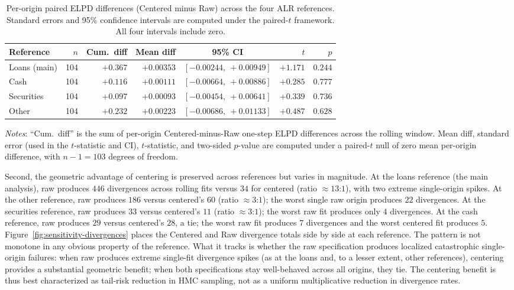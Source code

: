 \documentclass[12pt]{article}
\theoremstyle{remark}
\begin{document}
\begin{table}[!t]
\centering
\caption{Per-origin paired ELPD differences (Centered minus Raw) across the four ALR references. Standard errors and 95\% confidence intervals are computed under the paired-$t$ framework. All four intervals include zero.}
\label{tab:paired-elpd-ci}
\begin{tabular}{lrrrcrr}
\toprule
Reference & $n$ & Cum.\ diff & Mean diff & 95\% CI & $t$ & $p$ \\
\midrule
Loans (main) & 104 & $+0.367$ & $+0.00353$ & $[-0.00244,\ +0.00949]$ & $+1.171$ & $0.244$ \\
Cash         & 104 & $+0.116$ & $+0.00111$ & $[-0.00664,\ +0.00886]$ & $+0.285$ & $0.777$ \\
Securities   & 104 & $+0.097$ & $+0.00093$ & $[-0.00454,\ +0.00641]$ & $+0.339$ & $0.736$ \\
Other        & 104 & $+0.232$ & $+0.00223$ & $[-0.00686,\ +0.01133]$ & $+0.487$ & $0.628$ \\
\bottomrule
\end{tabular}

\vspace{0.4em}
\footnotesize\emph{Notes}: ``Cum.\ diff'' is the sum of per-origin Centered-minus-Raw one-step ELPD differences across the rolling window. Mean diff, standard error (used in the $t$-statistic and CI), $t$-statistic, and two-sided $p$-value are computed under a paired-$t$ null of zero mean per-origin difference, with $n-1=103$ degrees of freedom.
\end{table}

Second, the geometric advantage of centering is preserved across references but varies in magnitude. At the loans reference (the main analysis), raw produces $446$ divergences across rolling fits versus $34$ for centered (ratio $\approx 13$:$1$), with two extreme single-origin spikes. At the other reference, raw produces $186$ versus centered's $60$ (ratio $\approx 3$:$1$); the worst single raw origin produces $22$ divergences. At the securities reference, raw produces $33$ versus centered's $11$ (ratio $\approx 3$:$1$); the worst raw fit produces only $4$ divergences. At the cash reference, raw produces $29$ versus centered's $28$, a tie; the worst raw fit produces $7$ divergences and the worst centered fit produces $5$. Figure~\ref{fig:sensitivity-divergences} places the Centered and Raw divergence totals side by side at each reference. The pattern is not monotone in any obvious property of the reference. What it tracks is whether the raw specification produces localized catastrophic single-origin failures: when raw produces extreme single-fit divergence spikes (as at the loans and, to a lesser extent, other references), centering provides a substantial geometric benefit; when both specifications stay well-behaved across all origins, they tie. The centering benefit is thus best characterized as tail-risk reduction in HMC sampling, not as a uniform multiplicative reduction in divergence rates.
\end{document}
